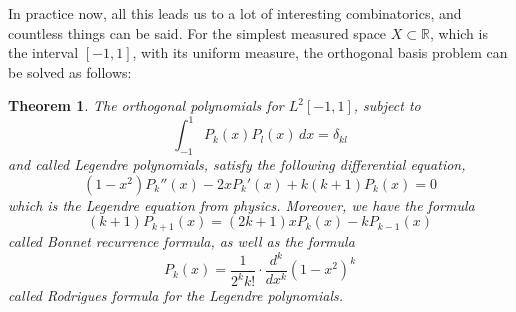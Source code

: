 \documentclass[12pt]{amsbook}
\newtheorem{theorem}{Theorem}[chapter]
\begin{document}
In practice now, all this leads us to a lot of interesting combinatorics, and countless things can be said. For the simplest measured space $X\subset\mathbb R$, which is the interval $[-1,1]$, with its uniform measure, the orthogonal basis problem can be solved as follows:


\begin{theorem}
The orthogonal polynomials for $L^2[-1,1]$, subject to
$$\int_{-1}^1P_k(x)P_l(x)\,dx=\delta_{kl}$$
and called Legendre polynomials, satisfy the following differential equation,
$$(1-x^2)P_k''(x)-2xP_k'(x)+k(k+1)P_k(x)=0$$
which is the Legendre equation from physics. Moreover, we have the formula
$$(k+1)P_{k+1}(x)=(2k+1)xP_k(x)-kP_{k-1}(x)$$
called Bonnet recurrence formula, as well as the formula
$$P_k(x)=\frac{1}{2^kk!}\cdot\frac{d^k}{dx^k}\left(1-x^2\right)^k$$
called Rodrigues formula for the Legendre polynomials.
\end{theorem}
\end{document}
